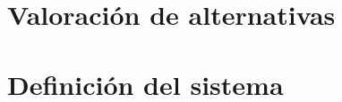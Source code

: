 \section{Valoración de alternativas}\label{sec:alternativas}


\section{Definición del sistema}\label{sec:definicion}
